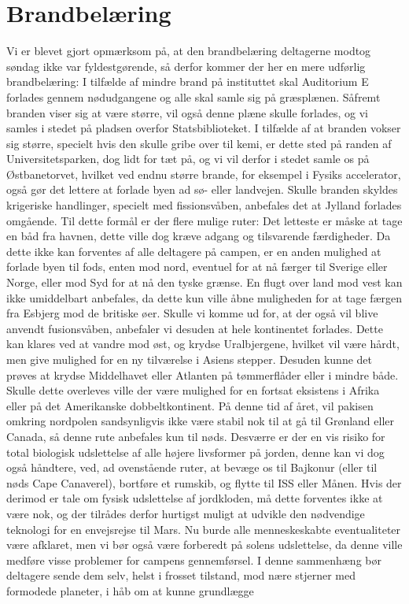 

\begin{minipage}[b]{0.95\linewidth}
\begin{minipage}[t]{0.47\textwidth}
\vspace{3mm}
\section*{Brandbelæring}
Vi er blevet gjort opmærksom på, at den brandbelæring deltagerne modtog søndag ikke var fyldestgørende, så derfor kommer der her en mere udførlig brandbelæring: I tilfælde af mindre brand på instituttet skal Auditorium E forlades gennem nødudgangene og alle skal samle sig på græsplænen. Såfremt branden viser sig at være større, vil også denne plæne skulle forlades, og vi samles i stedet på pladsen overfor Statsbiblioteket. I tilfælde af at branden vokser sig større, specielt hvis den skulle gribe over til kemi, er dette sted på randen af Universitetsparken, dog lidt for tæt på, og vi vil derfor i stedet samle os på Østbanetorvet, hvilket ved endnu større brande, for eksempel i Fysiks accelerator, også gør det lettere at forlade byen ad sø- eller landvejen. Skulle branden skyldes krigeriske handlinger, specielt med fissionsvåben, anbefales det at Jylland forlades omgående. Til dette formål er der flere mulige ruter: Det letteste er måske at tage en båd fra havnen, dette ville dog kræve adgang og tilsvarende færdigheder. Da dette ikke kan forventes af alle deltagere på campen, er en anden mulighed at forlade byen til fods, enten mod nord, eventuel for at nå færger til Sverige eller Norge, eller mod Syd for at nå den tyske grænse. En flugt over land mod vest kan ikke umiddelbart anbefales, da dette kun ville åbne muligheden for at tage færgen fra Esbjerg mod de britiske øer. Skulle vi komme ud for, at der også vil blive anvendt fusionsvåben, anbefaler vi desuden at hele kontinentet forlades. Dette kan klares ved at vandre mod øst, og krydse Uralbjergene, hvilket vil være hårdt, men give mulighed for en ny tilværelse i Asiens stepper. Desuden kunne det prøves at krydse Middelhavet eller Atlanten på tømmerflåder eller i mindre både. Skulle dette overleves ville der være mulighed for en fortsat eksistens i Afrika eller på det Amerikanske dobbeltkontinent. På denne tid af året, vil pakisen omkring nordpolen sandsynligvis ikke være stabil nok til at gå til Grønland eller Canada, så denne rute anbefales kun til nøds. Desværre er der en vis risiko for total biologisk udslettelse af alle højere livsformer på jorden, denne kan vi dog også håndtere, ved, ad ovenstående ruter, at bevæge os til Bajkonur (eller til nøds Cape Canaverel), bortføre et rumskib, og flytte til ISS eller Månen. Hvis der derimod er tale om fysisk udslettelse af jordkloden, må dette forventes ikke at være nok, og der tilrådes derfor hurtigst muligt at udvikle den nødvendige teknologi for en envejsrejse til Mars. Nu burde alle menneskeskabte eventualiteter være afklaret, men vi bør også være forberedt på solens udslettelse, da denne ville medføre visse problemer for campens gennemførsel. I denne sammenhæng bør deltagere sende dem selv, helst i frosset tilstand, mod nære stjerner med formodede planeter, i håb om at kunne grundlægge 
\end{minipage}
\end{minipage}
